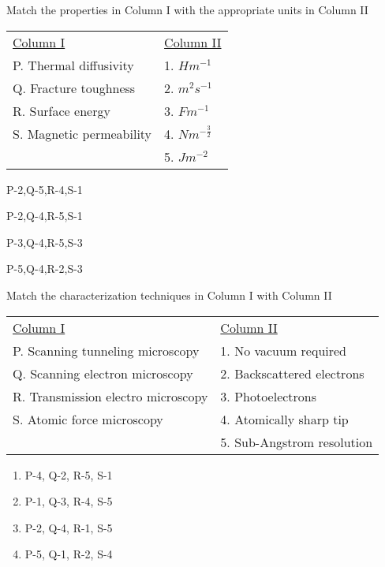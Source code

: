 \iffalse
\author{EE24BTECH11050}
\chapter{2012}
\section{xe}
\fi
\item %
Match the properties in Column I with the appropriate units in Column II \\
\begin{tabular}{l l}
\underline{Column I} & \underline{Column II} \\
P. Thermal diffusivity   & 1. $Hm^{-1}$ \\
Q. Fracture toughness    & 2. $m^2s^{-1}$ \\
R. Surface energy        & 3. $Fm^{-1}$ \\
S. Magnetic permeability & 4. $Nm^{-\frac{3}{2}}$ \\
                        & 5. $Jm^{-2}$
\end{tabular}
\begin{enumerate}
\begin{multicols}{2}
\item P-2,Q-5,R-4,S-1
\item P-2,Q-4,R-5,S-1
\item P-3,Q-4,R-5,S-3
\item P-5,Q-4,R-2,S-3
\end{multicols}
\end{enumerate}
\item %
Match the characterization techniques in Column I with Column II \\
\begin{tabular}{l l}
\underline{Column I} & \underline{Column II} \\
P. Scanning tunneling microscopy & 1. No vacuum required \\
Q. Scanning electron microscopy & 2. Backscattered electrons \\
R. Transmission electro microscopy & 3. Photoelectrons \\
S. Atomic force microscopy & 4. Atomically sharp tip\\
& 5.  Sub-Angstrom resolution \\
\end{tabular}
\begin{multicols}{2}
    \begin{enumerate}
        \item P-4, Q-2, R-5, S-1
        \item P-1, Q-3, R-4, S-5
        \item P-2, Q-4, R-1, S-5
        \item P-5, Q-1, R-2, S-4
    \end{enumerate}
\end{multicols}
